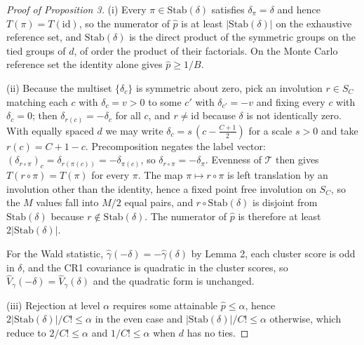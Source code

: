\documentclass[12pt]{article}
\theoremstyle{definition}
\numberwithin{equation}{section}
\begin{document}
\begin{proof}[Proof of Proposition 3]
(i) Every $\pi \in \mathrm{Stab}(\delta)$ satisfies $\delta_\pi = \delta$ and
hence $T(\pi) = T(\mathrm{id})$, so the numerator of $\hat{p}$ is at least
$|\mathrm{Stab}(\delta)|$ on the exhaustive reference set, and
$\mathrm{Stab}(\delta)$ is the direct product of the symmetric groups on the
tied groups of $d$, of order the product of their factorials. On the Monte Carlo
reference set the identity alone gives $\hat{p} \ge 1/B$.

(ii) Because the multiset $\{\delta_c\}$ is symmetric about zero, pick an
involution $r \in S_C$ matching each $c$ with $\delta_c = v > 0$ to some $c'$
with $\delta_{c'} = -v$ and fixing every $c$ with $\delta_c = 0$; then
$\delta_{r(c)} = -\delta_c$ for all $c$, and $r \ne \mathrm{id}$ because
$\delta$ is not identically zero. With equally spaced $d$ we may write
$\delta_c = s\,(c - \frac{C+1}{2})$ for a scale $s>0$ and take $r(c) = C+1-c$.
Precomposition negates the label vector:
$(\delta_{r \circ \pi})_c = \delta_{r(\pi(c))} = -\delta_{\pi(c)}$, so
$\delta_{r\circ\pi} = -\delta_\pi$. Evenness of $\mathcal{T}$ then gives
$T(r\circ\pi) = T(\pi)$ for every $\pi$. The map $\pi \mapsto r\circ\pi$ is left
translation by an involution other than the identity, hence a fixed point free
involution on $S_C$, so the $M$ values fall into $M/2$ equal pairs, and
$r\circ\mathrm{Stab}(\delta)$ is disjoint from $\mathrm{Stab}(\delta)$ because
$r \notin \mathrm{Stab}(\delta)$. The numerator of $\hat{p}$ is therefore at
least $2|\mathrm{Stab}(\delta)|$.

For the Wald statistic, $\hat{\gamma}(-\delta) = -\hat{\gamma}(\delta)$ by
Lemma 2, each cluster score is odd in $\delta$, and the CR1
covariance is quadratic in the cluster scores, so $\hat{V}_\gamma(-\delta) =
\hat{V}_\gamma(\delta)$ and the quadratic form is unchanged.

(iii) Rejection at level $\alpha$ requires some attainable $\hat p \le \alpha$,
hence $2|\mathrm{Stab}(\delta)|/C! \le \alpha$ in the even case and
$|\mathrm{Stab}(\delta)|/C! \le \alpha$ otherwise, which reduce to $2/C! \le
\alpha$ and $1/C! \le \alpha$ when $d$ has no ties.
\end{proof}
\end{document}
